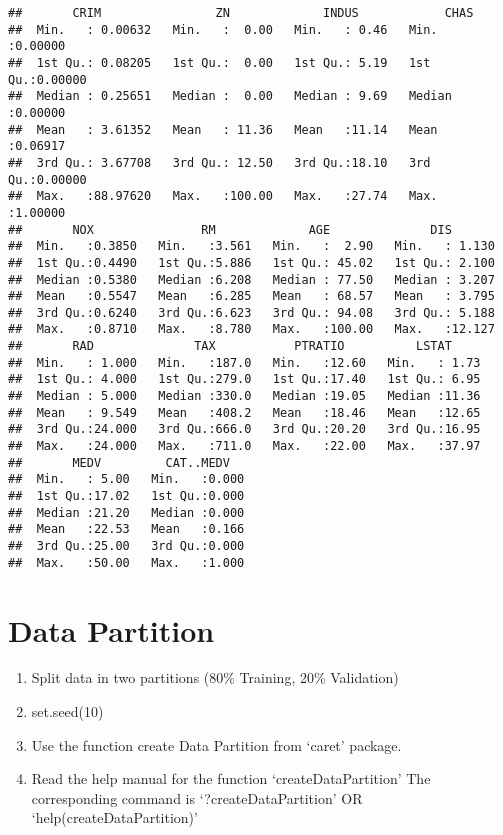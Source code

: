 \documentclass[
]{article}
\providecommand{\tightlist}{%
  \setlength{\itemsep}{0pt}\setlength{\parskip}{0pt}}
\begin{document}
\begin{verbatim}
##       CRIM                ZN             INDUS            CHAS        
##  Min.   : 0.00632   Min.   :  0.00   Min.   : 0.46   Min.   :0.00000  
##  1st Qu.: 0.08205   1st Qu.:  0.00   1st Qu.: 5.19   1st Qu.:0.00000  
##  Median : 0.25651   Median :  0.00   Median : 9.69   Median :0.00000  
##  Mean   : 3.61352   Mean   : 11.36   Mean   :11.14   Mean   :0.06917  
##  3rd Qu.: 3.67708   3rd Qu.: 12.50   3rd Qu.:18.10   3rd Qu.:0.00000  
##  Max.   :88.97620   Max.   :100.00   Max.   :27.74   Max.   :1.00000  
##       NOX               RM             AGE              DIS        
##  Min.   :0.3850   Min.   :3.561   Min.   :  2.90   Min.   : 1.130  
##  1st Qu.:0.4490   1st Qu.:5.886   1st Qu.: 45.02   1st Qu.: 2.100  
##  Median :0.5380   Median :6.208   Median : 77.50   Median : 3.207  
##  Mean   :0.5547   Mean   :6.285   Mean   : 68.57   Mean   : 3.795  
##  3rd Qu.:0.6240   3rd Qu.:6.623   3rd Qu.: 94.08   3rd Qu.: 5.188  
##  Max.   :0.8710   Max.   :8.780   Max.   :100.00   Max.   :12.127  
##       RAD              TAX           PTRATIO          LSTAT      
##  Min.   : 1.000   Min.   :187.0   Min.   :12.60   Min.   : 1.73  
##  1st Qu.: 4.000   1st Qu.:279.0   1st Qu.:17.40   1st Qu.: 6.95  
##  Median : 5.000   Median :330.0   Median :19.05   Median :11.36  
##  Mean   : 9.549   Mean   :408.2   Mean   :18.46   Mean   :12.65  
##  3rd Qu.:24.000   3rd Qu.:666.0   3rd Qu.:20.20   3rd Qu.:16.95  
##  Max.   :24.000   Max.   :711.0   Max.   :22.00   Max.   :37.97  
##       MEDV         CAT..MEDV    
##  Min.   : 5.00   Min.   :0.000  
##  1st Qu.:17.02   1st Qu.:0.000  
##  Median :21.20   Median :0.000  
##  Mean   :22.53   Mean   :0.166  
##  3rd Qu.:25.00   3rd Qu.:0.000  
##  Max.   :50.00   Max.   :1.000
\end{verbatim}

\hypertarget{data-partition}{%
\section{Data Partition}\label{data-partition}}

\begin{enumerate}
\def\labelenumi{\arabic{enumi})}
\tightlist
\item
  Split data in two partitions (80\% Training, 20\% Validation)
\item
  set.seed(10)
\item
  Use the function create Data Partition from `caret' package.
\item
  Read the help manual for the function `createDataPartition' The
  corresponding command is `?createDataPartition' OR
  `help(createDataPartition)'
\end{enumerate}
\end{document}
